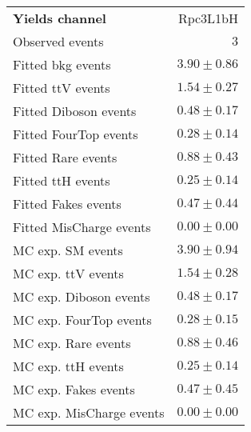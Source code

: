 

\begin{table}
\begin{center}
\setlength{\tabcolsep}{0.0pc}
{\small
\begin{tabular*}{\textwidth}{@{\extracolsep{\fill}}lr}
\noalign{\smallskip}\hline\noalign{\smallskip}
{\bfseries Yields channel}           & Rpc3L1bH              \\[-0.05cm]
\noalign{\smallskip}\hline\noalign{\smallskip}
Observed events          & $3$                    \\
\noalign{\smallskip}\hline\noalign{\smallskip}
Fitted bkg events         & $3.90 \pm 0.86$              \\
\noalign{\smallskip}\hline\noalign{\smallskip}
        Fitted ttV events         & $1.54 \pm 0.27$              \\
        Fitted Diboson events         & $0.48 \pm 0.17$              \\
        Fitted FourTop events         & $0.28 \pm 0.14$              \\
        Fitted Rare events         & $0.88 \pm 0.43$              \\
        Fitted ttH events         & $0.25 \pm 0.14$              \\
        Fitted Fakes events         & $0.47 \pm 0.44$              \\
        Fitted MisCharge events         & $0.00 \pm 0.00$              \\
 \noalign{\smallskip}\hline\noalign{\smallskip}
MC exp. SM events              & $3.90 \pm 0.94$              \\
\noalign{\smallskip}\hline\noalign{\smallskip}
        MC exp. ttV events         & $1.54 \pm 0.28$              \\
        MC exp. Diboson events         & $0.48 \pm 0.17$              \\
        MC exp. FourTop events         & $0.28 \pm 0.15$              \\
        MC exp. Rare events         & $0.88 \pm 0.46$              \\
        MC exp. ttH events         & $0.25 \pm 0.14$              \\
        MC exp. Fakes events         & $0.47 \pm 0.45$              \\
        MC exp. MisCharge events         & $0.00 \pm 0.00$              \\

\end{tabular*}}
\end{center}
\end{table}

